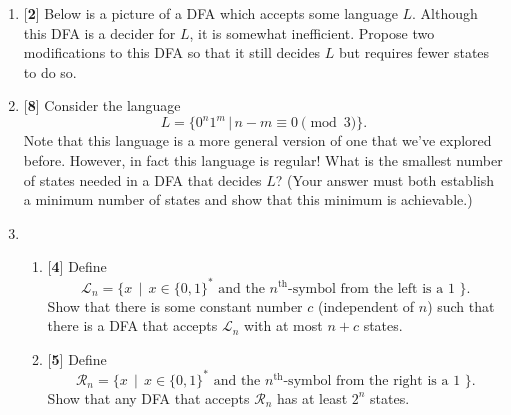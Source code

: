 \documentclass[11pt]{article}
\newcounter{enum}
\begin{document}
\begin{enumerate}
\setcounter{enumi}{\theenum}

\item {[}\textbf{2}{]} Below is a picture of a DFA which accepts some language $L$.  Although this DFA is a decider for $L$, it is somewhat inefficient.  Propose two modifications to this DFA so that it still decides $L$ but requires fewer states to do so.

\begin{center}
\end{center}

\item {[}\textbf{8}{]} Consider the language \[L=\{0^n1^m\,|\,n-m\equiv 0\pmod 3\}.\] Note that this language is a more general version of one that we've explored before.  However, in fact this language is regular!  What is the smallest number of states needed in a DFA that decides $L$? (Your answer must both establish a minimum number of states and show that this minimum is achievable.)

\item

\begin{enumerate}

\item {[}\textbf{4}{]} Define \[\mathcal{L}_n=\{x\,\mid\, x\in\{0,1\}^*\text{ and the }n^{\text{th}}\text{-symbol from the left is a 1 }\}.\]  Show that there is some constant number $c$ (independent of $n$) such that there is a DFA that accepts $\mathcal{L}_n$ with at most $n+c$ states.

\item {[}\textbf{5}{]} Define \[\mathcal{R}_n=\{x\,\mid\, x\in\{0,1\}^*\text{ and the }n^{\text{th}}\text{-symbol from the right is a 1 }\}.\]  Show that any DFA that accepts $\mathcal{R}_n$ has at least $2^n$ states.

\end{enumerate}

\setcounter{enum}{\theenumi}
\end{enumerate}
\end{document}
